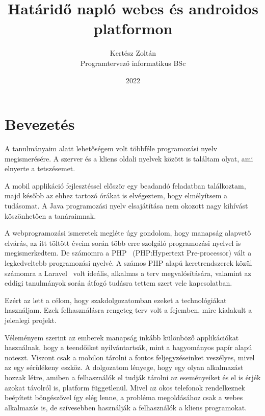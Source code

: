 \documentclass[
]{thesis-ekf}
\theoremstyle{definition}
\theoremstyle{remark}
\begin{document}
	\title{Határidő napló webes és androidos platformon}
	\author{Kertész Zoltán\\Programtervező informatikus BSc}
	\date{2022}
	\maketitle
	\tableofcontents
	
	\chapter*{Bevezetés}
	A tanulmányaim alatt lehetőségem volt többféle programozási nyelv megismerésére. A szerver és a kliens oldali nyelvek között is találtam olyat, ami elnyerte a tetszésemet. 
	
	A mobil applikáció fejlesztéssel először egy beadandó feladatban találkoztam, majd később az ehhez tartozó órákat is elvégeztem, hogy elmélyítsem a tudásomat. A Java programozási nyelv elsajátítása nem okozott nagy kihívást köszönhetően a tanáraimnak. 
	
	A webprogramozási ismeretek megléte úgy gondolom, hogy manapság alapvető elvárás, az itt töltött éveim során több erre szolgáló programozási nyelvel is megismerkedtem. De számomra a PHP~\cite{php_doc} (PHP:Hypertext Pre-processor) vált a legkedveltebb programozási nyelvé. A számos PHP alapú keretrendszerek közül számomra a Laravel~\cite{laravel_main} volt ideális, alkalmas a terv megvalósítására, valamint az eddigi tanulmányok során átfogó tudásra tettem szert vele kapcsolatban.
	
	Ezért az lett a célom, hogy szakdolgozatomban ezeket a technológiákat használjam. Ezek felhasználásra rengeteg terv volt a fejemben, mire kialakult a jelenlegi projekt.
	
	Véleményem szerint az emberek manapság inkább különböző applikációkat használnak, hogy a teendőiket nyilvántartsák, mint a hagyományos papír alapú noteszt. Viszont csak a mobilon tárolni a fontos feljegyzéseinket veszélyes, mivel az egy sérülékeny eszköz. A dolgozatom lényege, hogy egy olyan alkalmazást hozzak létre, amiben a felhasználók el tudják tárolni az eseményeiket és el is érjék azokat távolról is, platform függetlenül. Mivel az okos telefonok rendelkeznek beépített böngészővel így elég lenne, a probléma megoldásához csak a webes alkalmazás is, de szívesebben használják a felhasználók a kliens programokat. 
	
\end{document}
